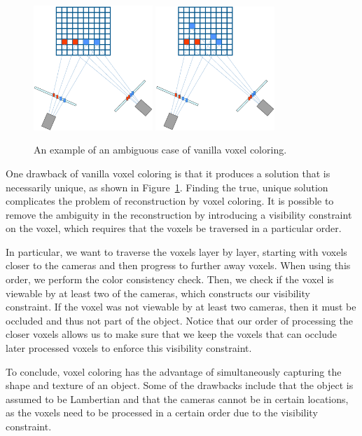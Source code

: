 \documentclass[a4paper, 12pt]{article}
\numberwithin{equation}{section}
\begin{document}
\begin{figure}[h!]
    \centering
    \includegraphics[width = 0.4\textwidth]{figures/ambiguity1.png}
    \includegraphics[width = 0.4\textwidth]{figures/ambiguity2.png}
    \caption{An example of an ambiguous case of vanilla voxel coloring.}
    \label{fig:ambiguity}
\end{figure}

One drawback of vanilla voxel coloring is that it produces a solution that is necessarily unique, as shown in Figure~\ref{fig:ambiguity}. Finding the true, unique solution complicates the problem of reconstruction by voxel coloring. It is possible to remove the ambiguity in the reconstruction by introducing a visibility constraint on the voxel, which requires that the voxels be traversed in a particular order. 

In particular, we want to traverse the voxels layer by layer, starting with voxels closer to the cameras and then progress to further away voxels. When using this order, we perform the color consistency check. Then, we check if the voxel is viewable by at least two of the cameras, which constructs our visibility constraint. If the voxel was not viewable by at least two cameras, then it must be occluded and thus not part of the object. Notice that our order of processing the closer voxels allows us to make sure that we keep the voxels that can occlude later processed voxels to enforce this visibility constraint. 

To conclude, voxel coloring has the advantage of simultaneously capturing the shape and texture of an object. Some of the drawbacks include that the object is assumed to be Lambertian and that the cameras cannot be in certain locations, as the voxels need to be processed in a certain order due to the visibility constraint.
\end{document}
